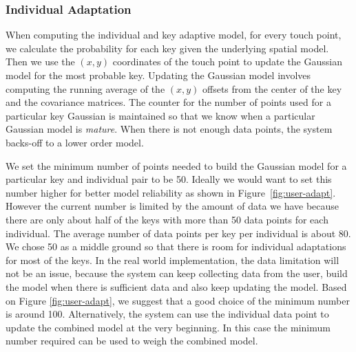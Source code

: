 \documentclass{sigchi}
\begin{document}


\subsubsection{Individual Adaptation}
When computing the individual and key adaptive model, for every touch point,
we calculate the probability for each key given the underlying spatial model.
Then we use the $(x, y)$ coordinates of the touch point to update the Gaussian model for the most probable key. Updating the Gaussian model involves computing the running average of the $(x, y)$ offsets from the center of the key and the covariance matrices. The counter for the number of points used for a particular key Gaussian is maintained so that we
know when a particular Gaussian model is \textit{mature}. When there is not enough data points, the system backs-off to a lower order model.

We set the minimum number of points needed to build the
Gaussian model for a particular key and individual pair to be 50.
Ideally we would want to set this number higher for better model reliability as 
shown in Figure~\ref{fig:user-adapt}. However the current number is limited by 
the amount of data we have because there are only about half of the keys
with more than 50 data points for each individual. The average number of data 
points per key per individual is about 80. We chose 50 as a middle ground so
that there is room for individual adaptations for most of the keys. In the real world 
implementation, the data limitation will not be an issue, because the system 
can keep collecting data from the user, build the model when there is 
sufficient data and also keep updating the model. Based on Figure
\ref{fig:user-adapt}, we suggest that a good choice of the minimum number is
around 100. Alternatively, the system can use the individual data point to 
update the combined model at the very beginning. In this case the minimum 
number required can be used to weigh the combined model.
\end{document}
